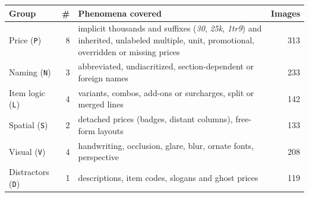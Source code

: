 \begin{tabular}{@{}lrp{8.1cm}r@{}}
\toprule
Group & \# & Phenomena covered & Images \\
\midrule
Price (\texttt{P}) & 8 & implicit thousands and suffixes (\textit{30}, \textit{25k}, \textit{1tr9}) and inherited, unlabeled multiple, unit, promotional, overridden or missing prices & 313 \\
Naming (\texttt{N}) & 3 & abbreviated, undiacritized, section-dependent or foreign names & 233 \\
Item logic (\texttt{L}) & 4 & variants, combos, add-ons or surcharges, split or merged lines & 142 \\
Spatial (\texttt{S}) & 2 & detached prices (badges, distant columns), free-form layouts & 133 \\
Visual (\texttt{V}) & 4 & handwriting, occlusion, glare, blur, ornate fonts, perspective & 208 \\
Distractors (\texttt{D}) & 1 & descriptions, item codes, slogans and ghost prices & 119 \\
\bottomrule
\end{tabular}

